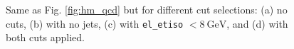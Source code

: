 \documentclass[a4paper]{report}
\numberwithin{equation}{section}
\begin{document}
\begin{figure}[htb!]
	\centering
	\quad
	\centering
    \quad
	\centering
    \quad
	\centering
	\caption{Same as Fig. \ref{fig:hm_qcd} but for different cut selections: (a) no cuts, (b) with no jets, (c) with 
    \texttt{el\_etiso} $< \SI{8}{\giga\electronvolt}$, and (d) with both cuts applied.}
	\label{fig:hm_fit}
\end{figure}
\end{document}
